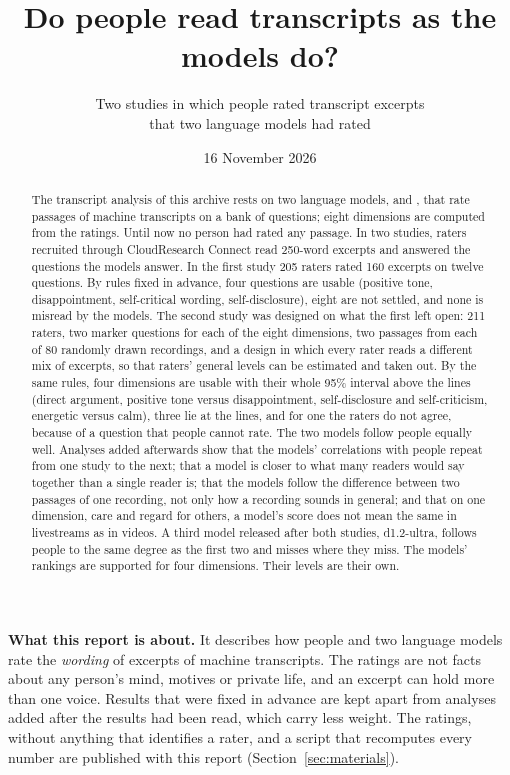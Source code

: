 \documentclass[11pt,letterpaper,parskip=half,headings=small,numbers=noenddot,captions=tableheading,abstract=on]{scrartcl}
\title{Do people read transcripts as the models do?}
\subtitle{Two studies in which people rated transcript excerpts\\ that two language models had rated}
\author{}
\date{16 November 2026}
\begin{document}
\maketitle
\thispagestyle{empty}

\begin{abstract}
\noindent The transcript analysis of this archive rests on two language models, \jev{} and \drex{}, that rate
passages of machine transcripts on a bank of questions; eight dimensions are computed from the ratings. Until now
no person had rated any passage. In two studies, raters recruited through CloudResearch Connect read 250-word
excerpts and answered the questions the models answer. In the first study 205 raters rated 160 excerpts on twelve
questions. By rules fixed in advance, four questions are usable (positive tone, disappointment, self-critical
wording, self-disclosure), eight are not settled, and none is misread by the models. The second study was
designed on what the first left open: 211 raters, two marker questions for each of the eight dimensions, two
passages from each of 80 randomly drawn recordings, and a design in which every rater reads a different mix of
excerpts, so that raters' general levels can be estimated and taken out. By the same rules, four dimensions are
usable with their whole 95\% interval above the lines (direct argument, positive tone versus disappointment,
self-disclosure and self-criticism, energetic versus calm), three lie at the lines, and for one the raters do
not agree, because of a question that people cannot rate. The two models follow people equally well. Analyses
added afterwards show that the models' correlations with people repeat from one study to the next; that a model
is closer to what many readers would say together than a single reader is; that the models follow the difference
between two passages of one recording, not only how a recording sounds in general; and that on one dimension,
care and regard for others, a model's score does not mean the same in livestreams as in videos. A third model
released after both studies, d1.2-ultra, follows people to the same degree as the first two and misses where
they miss. The models' rankings are supported for four dimensions. Their levels are their own.
\end{abstract}

\begin{center}
\begin{minipage}{0.92\textwidth}\footnotesize\sffamily\color{cpeople}
\textbf{What this report is about.} It describes how people and two language models rate the \emph{wording} of
excerpts of machine transcripts. The ratings are not facts about any person's mind, motives or private life, and
an excerpt can hold more than one voice. Results that were fixed in advance are kept apart from analyses added
after the results had been read, which carry less weight. The ratings, without anything that identifies a rater, and a script that recomputes
every number are published with this report (Section~\ref{sec:materials}).
\end{minipage}
\end{center}

\vspace{1ex}
\tableofcontents
\clearpage









\appendix

\end{document}
